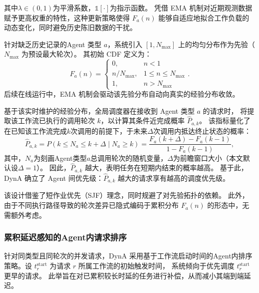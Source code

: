 \noindent 其中$\lambda \in \left(0, 1\right)$为平滑系数，$\mathbb{1}\left[\cdot\right]$为指示函数。
凭借 EMA 机制对近期观测数据赋予更高权重的特性，这种更新策略使得 $F_a\left(n\right)$ 能够自适应地拟合工作负载的动态变化，同时避免历史陈旧数据的干扰。

针对缺乏历史记录的Agent 类型 $a$，系统引入 $\left[1, N_{\max}\right]$ 上的均匀分布作为先验（$N_{\max}$ 为预设最大轮次）。
其初始 CDF 定义为：$$F_a\left(n\right) = \begin{cases}
  0, & n < 1 \\
  n / N_{\max}, & 1 \le n \le N_{\max} \\
  1, & n > N_{\max}
  \end{cases}.$$
后续在线运行中，EMA 机制会驱动该先验分布自动向真实的经验分布收敛。

基于该实时维护的经验分布，全局调度器在接收到 Agent 类型 $a$ 的请求时，
将提取该工作流已执行的调用轮次 $k$，以计算其条件近完成概率 $\hat{P}_{a,k}$。
该指标量化了在已知该工作流完成$k$次调用的前提下，于未来$\Delta$次调用内抵达终止状态的概率：
\begin{equation}\label{eq:conditional-prob}
  \hat{P}_{a,k} = P\left(k \leq N_a \leq k + \Delta \mid N_a \geq k\right) = \frac{F_a\left(k + \Delta\right) - F_a\left(k - 1\right)}{1 - F_a\left(k - 1\right)},
\end{equation}
\noindent 其中，$N_a$为刻画Agent类型$a$总调用轮次的随机变量，$\Delta$为前瞻窗口大小（本文默认设$\Delta = 1$）。
因此，$\hat{P}_{a,k}$ 越大，表明任务在短期内结束的概率越高。
基于此，DynA 确立了 Agent 间优先级：$\hat{P}_{a,k}$ 越大的请求享有越高的调度优先级。

该设计借鉴了短作业优先（SJF）理念，同时规避了对先验拓扑的依赖。
此外，由于不同执行路径导致的轮次差异已隐式编码于累积分布 $F_a\left(n\right)$ 的形态中，无需额外考虑。


\subsubsection{累积延迟感知的Agent内请求排序}\label{subsec:intra-agent}
针对同类型且同轮次的并发请求，DynA 采用基于工作流启动时间的Agent内排序策略。设 $t_r^{\text{start}}$ 为请求 $r$ 所属工作流的初始触发时间，
系统倾向于优先调度 $t_r^{\text{start}}$ 更早的请求。
此举旨在对已累积较长时延的任务进行补偿，从而减小其端到端延迟。

